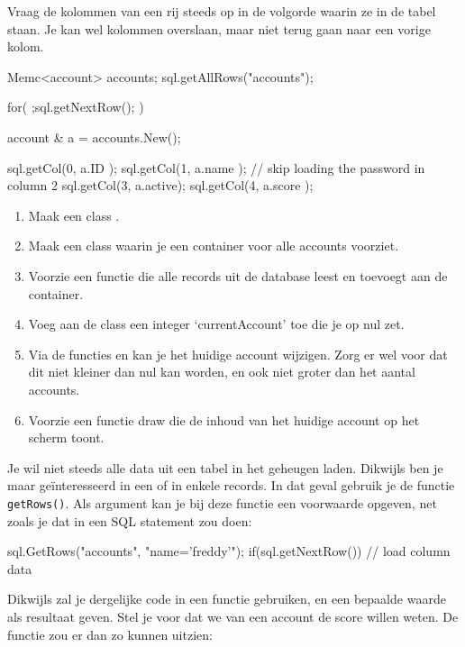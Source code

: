 \begin{note}
Vraag de kolommen van een rij steeds op in de volgorde waarin ze in de tabel staan. Je kan wel kolommen overslaan, maar niet terug gaan naar een vorige kolom.
\end{note}

\begin{code}
Memc<account> accounts;
sql.getAllRows("accounts");

for( ;sql.getNextRow(); ) {
  account & a = accounts.New();
	
	sql.getCol(0, a.ID    );
	sql.getCol(1, a.name  );
	// skip loading the password in column 2
	sql.getCol(3, a.active);
	sql.getCol(4, a.score );
}
\end{code}

\begin{exercise}
	\begin{enumerate}
		\item Maak een class .
		\item Maak een class  waarin je een container voor alle accounts voorziet. 
		\item Voorzie een functie  die alle records uit de database leest en toevoegt aan de container. 
		\item Voeg aan de class een integer `currentAccount' toe die je op nul zet. 
		\item Via de functies  en  kan je het huidige account wijzigen. Zorg er wel voor dat dit niet kleiner dan nul kan worden, en ook niet groter dan het aantal accounts.
		\item Voorzie een functie draw die de inhoud van het huidige account op het scherm toont.
	\end{enumerate}
\end{exercise}

Je wil niet steeds alle data uit een tabel in het geheugen laden. Dikwijls ben je maar ge\"interesseerd in een of in enkele records. In dat geval gebruik je de functie \texttt{getRows()}. Als argument kan je bij deze functie een voorwaarde opgeven, net zoals je dat in een SQL statement zou doen:

\begin{code}
sql.GetRows("accounts", "name='freddy'");
if(sql.getNextRow()) {
	// load column data
}
\end{code}

Dikwijls zal je dergelijke code in een functie gebruiken, en een bepaalde waarde als resultaat geven. Stel je voor dat we van een account de score willen weten. De functie zou er dan zo kunnen uitzien:

